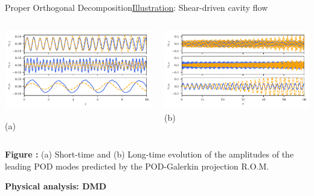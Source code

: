 \documentclass[usenames,dvipsnames,svgnames,10pt,aspectratio=169]{beamer}
\begin{document}
\begin{frame}[t, c]{Proper Orthogonal Decomposition}{\underline{Illustration}: Shear-driven cavity flow}
	\begin{columns}
		\begin{column}{.5\textwidth}
			\centering
			\includegraphics[width=.9\textwidth]{galerkin_projection_chronos}

			(a)
		\end{column}
		\begin{column}{.5\textwidth}
			\centering
			\includegraphics[width=.9\textwidth]{galerkin_projection_chronos_bis} \\

			(b)
		\end{column}

	\end{columns}

	\bigskip

	\textbf{Figure :} (a) Short-time and (b) Long-time evolution of the amplitudes of the leading POD modes predicted by the POD-Galerkin projection R.O.M.

	\vspace{0.5cm}
\end{frame}

\begin{frame}[t, c]{}
	\centering
	\vspace{1cm}

	{\Large \textbf{Physical analysis: DMD}}

	\bigskip

	{}

\end{frame}
\end{document}
